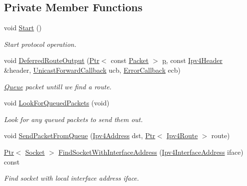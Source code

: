 \subsection*{Private Member Functions}
\begin{DoxyCompactItemize}
\item 
void \hyperlink{classns3_1_1dsdv_1_1RoutingProtocol_a1e6145b4ecb927243c4758012036c45a}{Start} ()
\begin{DoxyCompactList}\small\item\em Start protocol operation. \end{DoxyCompactList}\item 
void \hyperlink{classns3_1_1dsdv_1_1RoutingProtocol_a69ada1af49e7f09f91199062e14fb75f}{Deferred\+Route\+Output} (\hyperlink{classns3_1_1Ptr}{Ptr}$<$ const \hyperlink{classns3_1_1Packet}{Packet} $>$ \hyperlink{lte__link__budget__x2__handover__measures_8m_ac9de518908a968428863f829398a4e62}{p}, const \hyperlink{classns3_1_1Ipv4Header}{Ipv4\+Header} \&header, \hyperlink{classns3_1_1Ipv4RoutingProtocol_a3453a85764cbbb1e704da7e919aa5d19}{Unicast\+Forward\+Callback} ucb, \hyperlink{classns3_1_1Ipv4RoutingProtocol_a0348285418c30d5021b08f7a68af21ea}{Error\+Callback} ecb)
\begin{DoxyCompactList}\small\item\em \hyperlink{classns3_1_1Queue}{Queue} packet untill we find a route. \end{DoxyCompactList}\item 
void \hyperlink{classns3_1_1dsdv_1_1RoutingProtocol_a775bb168f6e8c4feb854aba73326681e}{Look\+For\+Queued\+Packets} (void)
\begin{DoxyCompactList}\small\item\em Look for any queued packets to send them out. \end{DoxyCompactList}\item 
void \hyperlink{classns3_1_1dsdv_1_1RoutingProtocol_a9359912928dc5b8dc851366a78c0cc8c}{Send\+Packet\+From\+Queue} (\hyperlink{classns3_1_1Ipv4Address}{Ipv4\+Address} dst, \hyperlink{classns3_1_1Ptr}{Ptr}$<$ \hyperlink{classns3_1_1Ipv4Route}{Ipv4\+Route} $>$ route)
\item 
\hyperlink{classns3_1_1Ptr}{Ptr}$<$ \hyperlink{classns3_1_1Socket}{Socket} $>$ \hyperlink{classns3_1_1dsdv_1_1RoutingProtocol_ab87d72bcdb89e0ff1034912db8868c01}{Find\+Socket\+With\+Interface\+Address} (\hyperlink{classns3_1_1Ipv4InterfaceAddress}{Ipv4\+Interface\+Address} iface) const 
\begin{DoxyCompactList}\small\item\em Find socket with local interface address iface. \end{DoxyCompactList}\item 

\end{DoxyCompactItemize}
